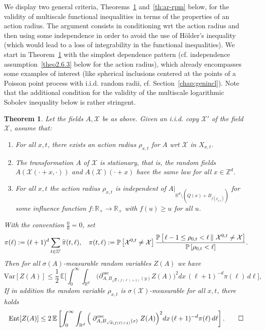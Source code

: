 \documentclass[10pt]{amsart}
\newtheorem{theo}{Theorem}[section]
\theoremstyle{definition}\newtheorem{defi}[theo]{Definition}\newtheorem{rema}[theo]{Remark}\newtheorem{exam}[theo]{Example}\newtheorem{exem}[theo]{Example}\newtheorem{nota}[theo]{Notation}
\newcommand{\R}{\mathbb R}
\newcommand{\Z}{\mathbb Z}
\newcommand{\expecM}[1]{\mathbb{E}\bigg[#1 \bigg]}
\newcommand{\expec}[1]{\mathbb{E}\left[#1 \right]}
\newcommand{\pr}[1]{\mathbb{P}\left[#1 \right]}
\newcommand{\prC}[2]{\mathbb{P}\left[\left. #1 \,\right\|\,#2\right]}
\newcommand{\X}{\mathcal X}
\newcommand{\osc}{\partial^{\mathrm{osc}}}
\newcommand{\oscd}[1]{\mathrel{\osc_{#1}}}
\newcommand{\var}[1]{\mathrm{Var}\left[#1\right]}
\newcommand{\ent}[1]{\mathrm{Ent}\!\left[#1\right]}
\newcommand*{\alphenumi}{\renewcommand*{\theenumi}{\alph{enumi}}}
\let\oldtilde\tilde
\renewcommand*{\tilde}[1]{\mathchoice{\widetilde{#1}}{\widetilde{#1}}{\oldtilde{#1}}{\oldtilde{#1}}}\let\oldhat\hat
\renewcommand*{\hat}[1]{\mathchoice{\widehat{#1}}{\widehat{#1}}{\oldhat{#1}}{\oldhat{#1}}}\let\oldexists\exists
\renewcommand*{\exists}{\mathrel{\oldexists}}
\begin{document}
We display two general criteria, Theorems~\ref{th:ar} and~\ref{th:ar-rpm} below, for the validity of multiscale functional inequalities in terms of the properties of an action radius. The argument consists in conditioning wrt the action radius and then using some independence in order to avoid the use of H\"older's inequality (which would lead to a loss of integrability in the functional inequalities). We start in Theorem~\ref{th:ar} with the simplest dependence pattern (cf. independence assumption~\eqref{theo2.6.3} below for the action radius), which already encompasses some examples of interest (like spherical inclusions centered at the points of a Poisson point process with i.i.d. random radii, cf. Section~\ref{chap:genincl}). Note that the additional condition for the validity of the multiscale logarithmic Sobolev inequality below is rather stringent.
\begin{theo}\label{th:ar}
Let the fields $A,\X$ be as above. Given an i.i.d. copy $\X'$ of the field $\X$, assume that:
\begin{enumerate} \alphenumi 
\item \label{theo2.6.1}For all $x,t$, there exists an action radius $\rho_{x,t}$ for $A$ wrt $\X$ in $X_{x,t}$.
\item \label{theo2.6.2}The transformation $A$ of $\X$ is stationary, that is, the random fields\linebreak $A(\X(\cdot+x,\cdot))$ and $A(\X)(\cdot+x)$ have the same law for all $x\in\Z^d$.
\item \label{theo2.6.3}For all $x,t$ the action radius $\rho_{x,t}$ is independent of $A|_{\R^d\setminus (Q(x)+B_{f(\rho_{x,t})})}$ for some \emph{influence function} $f:\R_+\to\R_+$ with $f(u)\ge u$ for all $u$.
\end{enumerate}
With the convention $\frac00=0$, set
\[
\pi(\ell):=(\ell+1)^{d}\sum_{t\in\Z^l}\tilde\pi(t,\ell),\quad
\pi(t,\ell):=\pr{\X^{0,t}\ne \X}\frac{\prC{\ell-1\le\rho_{0,t}<\ell}{\X^{0,t}\ne \X}}{\pr{\rho_{0,t}<\ell}}.
\]
Then for all $\sigma(A)$-measurable random variables $Z(A)$ we have
\begin{equation}\label{eq:arwsg2}
\var{Z(A)}\le\frac12\,\expecM{\int_0^\infty\int_{\R^d}\,\Big(\oscd{A,B_{\sqrt d(f(\ell)+1)}(y)}Z(A)\Big)^2dx\,(\ell+1)^{-d} \pi(\ell)\,d\ell},
\end{equation}
If in addition the random variable $\rho_{x,t}$ is $\sigma(\X)$-measurable for all $x,t$, there holds
\begin{equation}
\ent{Z(A)}\le2\,\expec{ \int_{0}^\infty \int_{\R^d}\Big(\oscd{A,B_{\sqrt{d}(f(\ell)+1)}(x)}Z(A)\Big)^2dx\,(\ell+1)^{-d}\pi(\ell)\,d\ell}.\label{eq:arlsi2}
\qedhere
\end{equation}

\end{theo}
\end{document}
